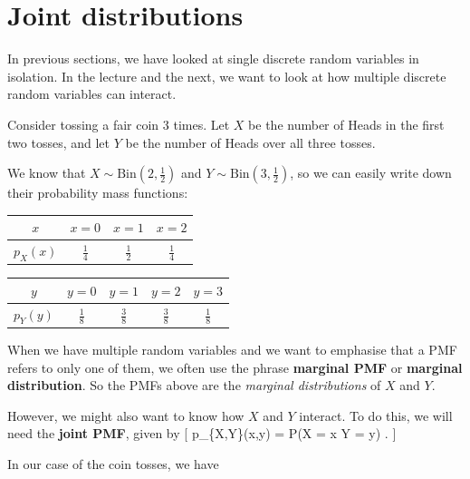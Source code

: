 \documentclass[
  letterpaper,
  DIV=11,
  numbers=noendperiod]{scrreprt}
\theoremstyle{remark}
\begin{document}
\hypertarget{joint}{%
\section{Joint distributions}\label{joint}}

In previous sections, we have looked at single discrete random variables
in isolation. In the lecture and the next, we want to look at how
multiple discrete random variables can interact.

Consider tossing a fair coin 3 times. Let \(X\) be the number of Heads
in the first two tosses, and let \(Y\) be the number of Heads over all
three tosses.

We know that \(X \sim \text{Bin}(2, \frac12)\) and
\(Y \sim \text{Bin}(3, \frac12)\), so we can easily write down their
probability mass functions:

\begin{longtable}[]{@{}cccc@{}}
\toprule()
\(x\) & \(x = 0\) & \(x = 1\) & \(x = 2\) \\
\midrule()
\endhead
\(p_X(x)\) & \(\frac14\) & \(\frac12\) & \(\frac14\) \\
\bottomrule()
\end{longtable}

\begin{longtable}[]{@{}ccccc@{}}
\toprule()
\(y\) & \(y = 0\) & \(y = 1\) & \(y = 2\) & \(y = 3\) \\
\midrule()
\endhead
\(p_Y(y)\) & \(\frac18\) & \(\frac38\) & \(\frac38\) & \(\frac18\) \\
\bottomrule()
\end{longtable}

When we have multiple random variables and we want to emphasise that a
PMF refers to only one of them, we often use the phrase \textbf{marginal
PMF} or \textbf{marginal distribution}. So the PMFs above are the
\emph{marginal distributions} of \(X\) and \(Y\).

However, we might also want to know how \(X\) and \(Y\) interact. To do
this, we will need the \textbf{joint PMF}, given by {[} p\_\{X,Y\}(x,y)
= \mathbb P(X = x  Y = y) . {]}

In our case of the coin tosses, we have
\end{document}

